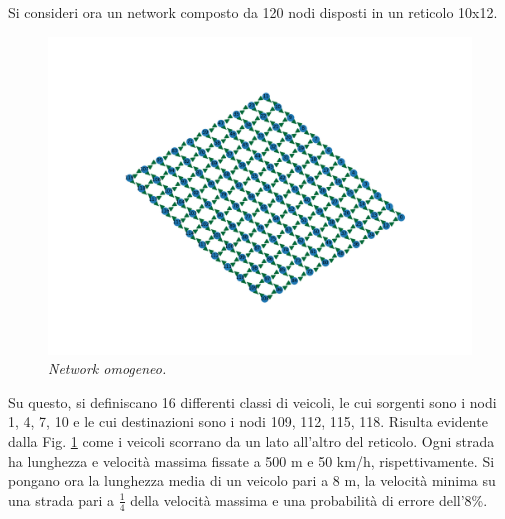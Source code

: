 \documentclass[../main.tex]{subfiles}
\begin{document}
Si consideri ora un network composto da 120 nodi disposti in un reticolo 10x12.
\begin{figure}
    \includegraphics[scale=0.25, trim={2cm 5cm 10cm 5cm},clip]{./data/img/network.png}
    \caption[Network omogeneo]{\emph{Network omogeneo.}}
    \label{fig:network_homo}
\end{figure}
Su questo, si definiscano 16 differenti classi di veicoli, le cui sorgenti sono i nodi 1, 4, 7, 10 e le cui destinazioni sono i nodi 109, 112, 115, 118.
Risulta evidente dalla Fig. \ref{fig:network_homo} come i veicoli scorrano da un lato all'altro del reticolo.
Ogni strada ha lunghezza e velocit\`a massima fissate a 500 m e 50 km/h, rispettivamente.
Si pongano ora la lunghezza media di un veicolo pari a 8 m, la velocit\`a minima su una strada pari a $\frac{1}{4}$ della velocit\`a massima e una probabilit\`a di errore dell'8\%.
\end{document}
